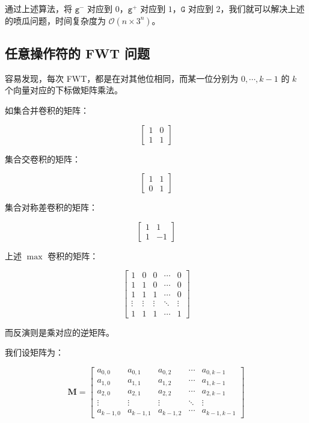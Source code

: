 \documentclass{article}
\begin{document}
通过上述算法，将 $\texttt{g}^-$ 对应到 $0$，$\texttt{g}^+$ 对应到 $1$，$\texttt{G}$ 对应到 $2$，我们就可以解决上述的喷瓜问题，时间复杂度为 $\mathcal O(n \times 3^n)$。

\subsection{任意操作符的 FWT 问题}

容易发现，每次 FWT，都是在对其他位相同，而某一位分别为 $0, \cdots ,k-1$ 的 $k$ 个向量对应的下标做矩阵乘法。

如集合并卷积的矩阵：

$$\begin{bmatrix} 1 & 0 \\ 1 & 1 \end{bmatrix}$$

集合交卷积的矩阵：

$$\begin{bmatrix} 1 & 1 \\ 0 & 1 \end{bmatrix}$$

集合对称差卷积的矩阵：

$$\begin{bmatrix} 1 & 1 \\ 1 & -1 \end{bmatrix}$$

上述 $\max$ 卷积的矩阵：

$$\begin{bmatrix} 1& 0 & 0& \cdots & 0\\ 1& 1& 0& \cdots & 0\\ 1& 1 & 1& \cdots & 0\\ \vdots& \vdots& \vdots& \ddots& \vdots\\ 1& 1& 1 & \cdots & 1 \end{bmatrix}$$

而反演则是乘对应的逆矩阵。

我们设矩阵为：

$$\mathbf{M}=\begin{bmatrix} a_{0,0}&  a_{0,1} &  a_{0,2}& \cdots &  a_{0,k-1}\\  a_{1,0}&  a_{1,1}&  a_{1,2}& \cdots &  a_{1,k-1}\\  a_{2,0}&  a_{2,1} &  a_{2,2}& \cdots &  a_{2,k-1}\\ \vdots& \vdots& \vdots& \ddots& \vdots\\  a_{k-1,0}&  a_{k-1,1}&  a_{k-1,2} & \cdots &  a_{k-1,k-1} \end{bmatrix}$$
\end{document}
